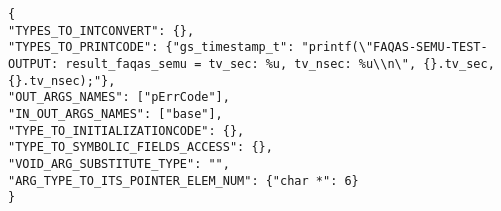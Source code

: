 
\begin{lstlisting}[float=h, style=CStyle, caption=SEMuS configuration example., label=test_config]
{
"TYPES_TO_INTCONVERT": {},
"TYPES_TO_PRINTCODE": {"gs_timestamp_t": "printf(\"FAQAS-SEMU-TEST-OUTPUT: result_faqas_semu = tv_sec: %u, tv_nsec: %u\\n\", {}.tv_sec, {}.tv_nsec);"},
"OUT_ARGS_NAMES": ["pErrCode"],
"IN_OUT_ARGS_NAMES": ["base"],
"TYPE_TO_INITIALIZATIONCODE": {},
"TYPE_TO_SYMBOLIC_FIELDS_ACCESS": {},
"VOID_ARG_SUBSTITUTE_TYPE": "",
"ARG_TYPE_TO_ITS_POINTER_ELEM_NUM": {"char *": 6}
}
\end{lstlisting}